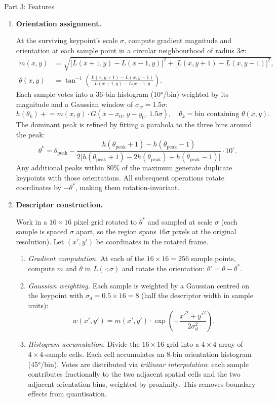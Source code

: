 \documentclass[letterpaper]{article}
\begin{document}
\begin{notes}{Part 3: Features}
\begin{enumerate}
    \item \textbf{Orientation assignment.}

    At the surviving keypoint's scale $\sigma$, compute gradient magnitude and orientation at each sample point in a circular neighbourhood of radius $3\sigma$:
    \begin{align*}
    m(x,y) &= \sqrt{\bigl[L(x{+}1,y)-L(x{-}1,y)\bigr]^2 + \bigl[L(x,y{+}1)-L(x,y{-}1)\bigr]^2},\\
    \theta(x,y) &= \tan^{-1}\left( \frac{L(x,y{+}1)-L(x,y{-}1)}{L(x{+}1,y)-L(x{-}1,y} \right).
    \end{align*}
    Each sample votes into a 36-bin histogram (10°/bin) weighted by its magnitude and a Gaussian window of $\sigma_w = 1.5\sigma$:
    $$h(\theta_k) \mathrel{+}= m(x,y)\cdot G(x-x_0,\,y-y_0,\,1.5\sigma), \quad \theta_k = \text{bin containing }\theta(x,y).$$
    The dominant peak is refined by fitting a parabola to the three bins around the peak:
    $$\theta^* = \theta_{\text{peak}} - \frac{h(\theta_{\text{peak}}+1) - h(\theta_{\text{peak}}-1)}{2\bigl[h(\theta_{\text{peak}}+1) - 2h(\theta_{\text{peak}}) + h(\theta_{\text{peak}}-1)\bigr]} \cdot 10^\circ.$$
    Any additional peaks within 80\% of the maximum generate duplicate keypoints with those orientations. All subsequent operations rotate coordinates by $-\theta^*$, making them rotation-invariant.

    \item \textbf{Descriptor construction.}

    Work in a $16\times16$ pixel grid rotated to $\theta^*$ and sampled at scale $\sigma$ (each sample is spaced $\sigma$ apart, so the region spans $16\sigma$ pixels at the original resolution). Let $(x',y')$ be coordinates in the rotated frame.

    \begin{enumerate}
        \item     \emph{Gradient computation.} At each of the $16\times16 = 256$ sample points, compute $m$ and $\theta$ in $L(\cdot;\sigma)$ and rotate the orientation: $\theta' = \theta - \theta^*$.
    
        \item \emph{Gaussian weighting.} Each sample is weighted by a Gaussian centred on the keypoint with $\sigma_d = 0.5 \times 16 = 8$ (half the descriptor width in sample units):
        $$w(x',y') = m(x',y')\cdot \exp\!\left(-\frac{x'^2+y'^2}{2\sigma_d^2}\right).$$
        
        \item \emph{Histogram accumulation.} Divide the $16\times16$ grid into a $4\times4$ array of $4\times4$-sample cells. Each cell accumulates an 8-bin orientation histogram (45°/bin). Votes are distributed via \emph{trilinear interpolation}: each sample contributes fractionally to the two adjacent spatial cells and the two adjacent orientation bins, weighted by proximity. This removes boundary effects from quantisation.
        

\end{enumerate}
\end{enumerate}
\end{notes}
\end{document}
